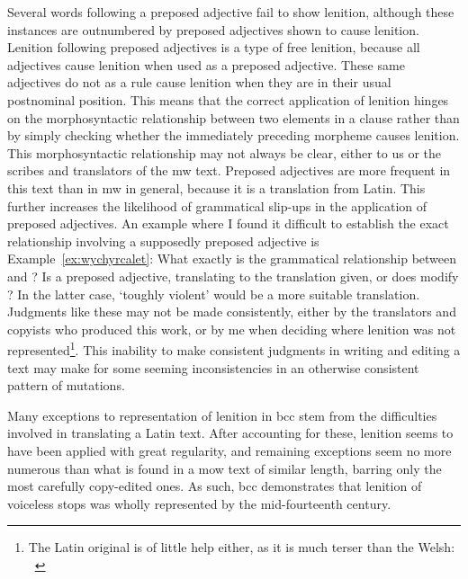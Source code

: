 Several words following a preposed adjective fail to show lenition, although these instances are outnumbered by preposed adjectives shown to cause lenition.
Lenition following preposed adjectives is a type of free lenition, because all adjectives cause lenition when used as a preposed adjective.
These same adjectives do not as a rule cause lenition when they are in their usual postnominal position.
This means that the correct application of lenition hinges on the morphosyntactic relationship between two elements in a clause rather than by simply checking whether the immediately preceding morpheme causes lenition.
This morphosyntactic relationship may not always be clear, either to us or the scribes and translators of the \gls{mw} text.
Preposed adjectives are more frequent in this text than in \gls{mw} in general, because it is a translation from Latin.
This further increases the likelihood of grammatical slip-ups in the application of preposed adjectives.
An example where I found it difficult to establish the exact relationship involving a supposedly preposed adjective is Example~\ref{ex:wychyrcalet}:
What exactly is the grammatical relationship between  and ?
Is  a preposed adjective, translating to the translation given, or does  modify ?
In the latter case, `toughly violent' would be a more suitable translation. 
Judgments like these may not be made consistently, either by the translators and copyists who produced this work, or by me when deciding where lenition was not represented\footnote{The Latin original is of little help either, as it is much terser than the Welsh: ~\autocite[269]{griscom_historia_1929}}.
This inability to make consistent judgments in writing and editing a text may make for some seeming inconsistencies in an otherwise consistent pattern of mutations.

Many exceptions to representation of lenition in \gls{bcc} stem from the difficulties involved in translating a Latin text.
After accounting for these, lenition seems to have been applied with great regularity, and remaining exceptions seem no more numerous than what is found in a \gls{mow} text of similar length, barring only the most carefully copy-edited ones.
As such, \gls{bcc} demonstrates that lenition of voiceless stops was wholly represented by the mid-fourteenth century.

